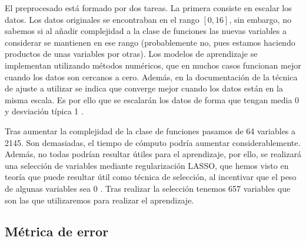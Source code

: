 \documentclass[a4paper, 20pt]{article}
\begin{document}
{%

El preprocesado está formado por dos tareas. La primera consiste en escalar los datos. Los datos originales se encontraban en el rango $[0,16]$, sin embargo, no sabemos si al añadir complejidad a la clase de funciones las nuevas variables a considerar se mantienen en ese rango (probablemente no, pues estamos haciendo productos de unas variables por otras). Los modelos de aprendizaje se implementan utilizando métodos numéricos, que en muchos casos funcionan mejor cuando los datos son cercanos a cero. Además, en la documentación de la técnica de ajuste a utilizar se indica que converge mejor cuando los datos están en la misma escala. Es por ello que se escalarán los datos de forma que tengan media 0 y desviación típica 1 \cite{scaler}.

Tras aumentar la complejidad de la clase de funciones pasamos de 64 variables a 2145. Son demasiadas, el tiempo de cómputo podría aumentar considerablemente. Además, no todas podrían resultar útiles para el aprendizaje, por ello, se realizará una selección de variables mediante regularización LASSO, que hemos visto en teoría que puede resultar útil como técnica de selección, al incentivar que el peso de algunas variables sea 0  \cite{lasso}. Tras realizar la selección tenemos 657 variables que son las que utilizaremos para realizar el aprendizaje.

\subsection{Métrica de error}

}
\end{document}

